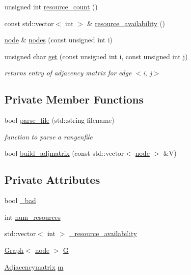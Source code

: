 \begin{DoxyCompactItemize}
\item 
unsigned int \hyperlink{class_ran_gen_file_a8d863bb32a361d2a26ffac7d855fa5a8}{resource\+\_\+count} ()
\item 
const std\+::vector$<$ int $>$ \& \hyperlink{class_ran_gen_file_ac3b54db41ef76449f0959239696441ec}{resource\+\_\+availability} ()
\item 
\hyperlink{classnode}{node} \& \hyperlink{class_ran_gen_file_a5b4b00d598670e64ccef23b7efce2f95}{nodes} (const unsigned int i)
\item 
unsigned char \hyperlink{class_ran_gen_file_afe6fc3d6a798072f26a0749496baacb1}{get} (const unsigned int i, const unsigned int j)
\begin{DoxyCompactList}\small\item\em returns entry of adjacency matrix for edge $<$i, j$>$ \end{DoxyCompactList}\end{DoxyCompactItemize}
\subsection*{Private Member Functions}
\begin{DoxyCompactItemize}
\item 
bool \hyperlink{class_ran_gen_file_a34e65dc475df50ba7b84336bd515738c}{parse\+\_\+file} (std\+::string filename)
\begin{DoxyCompactList}\small\item\em function to parse a rangenfile \end{DoxyCompactList}\item 
bool \hyperlink{class_ran_gen_file_ae069767b2544f43333faee3c5918d7dc}{build\+\_\+adjmatrix} (const std\+::vector$<$ \hyperlink{classnode}{node} $>$ \&V)
\end{DoxyCompactItemize}
\subsection*{Private Attributes}
\begin{DoxyCompactItemize}
\item 
bool \hyperlink{class_ran_gen_file_a048cfb6864f84f006dbac231c40456c6}{\+\_\+bad}
\item 
int \hyperlink{class_ran_gen_file_a97c8732fd545bc26cf0b50af98e52ecb}{num\+\_\+resources}
\item 
std\+::vector$<$ int $>$ \hyperlink{class_ran_gen_file_acda50b98a19bab75de33540ab7811500}{\+\_\+resource\+\_\+availability}
\item 
\hyperlink{class_graph}{Graph}$<$ \hyperlink{classnode}{node} $>$ \hyperlink{class_ran_gen_file_ae1ab1e4afb3e3b9913359ea29c983ad6}{G}
\item 
\hyperlink{class_adjacencymatrix}{Adjacencymatrix} \hyperlink{class_ran_gen_file_ae182f5083556f37272e1b71eed5d42fc}{m}
\end{DoxyCompactItemize}


